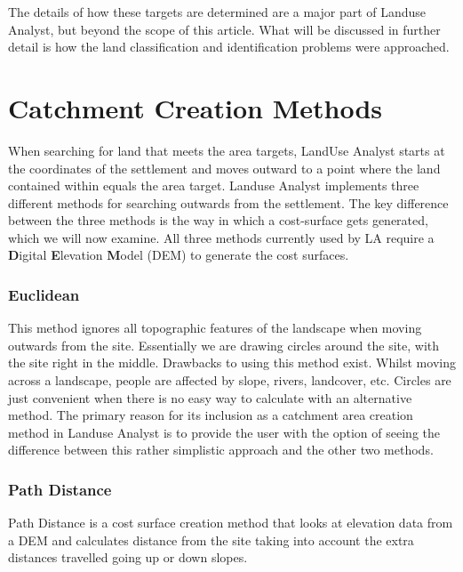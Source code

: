 The details of how these targets are determined are a major part of Landuse
Analyst, but beyond the scope of this article.  What will be discussed in
further detail is how the land classification and identification problems were
approached.

\section{Catchment Creation Methods} 

When searching for land that meets the area targets, LandUse Analyst starts at
the coordinates of the settlement and moves outward to a point where the land
contained within equals the area target.  Landuse Analyst implements three
different methods for searching outwards from the settlement.  The key
difference between the three methods is the way in which a cost-surface gets
generated, which we will now examine.  All three methods currently used by LA
require a \textbf{D}igital \textbf{E}levation \textbf{M}odel (DEM) to generate
the cost surfaces.



  \subsubsection{Euclidean} \label{subsection:Euclidean} 
  
  This method ignores all topographic features of the landscape when moving
  outwards from the site.  Essentially we are drawing circles around the site,
  with the site right in the middle.  Drawbacks to using this method exist.
  Whilst moving across a landscape, people are affected by slope, rivers,
  landcover, etc.  Circles are just convenient when there is no easy way to
  calculate with an alternative method.  The primary reason for its inclusion
  as a catchment area creation method in Landuse Analyst is to provide the user
  with the option of seeing the difference between this rather simplistic
  approach and the other two methods.

  \subsubsection{Path Distance}
  
  Path Distance is a cost surface creation method that looks at elevation data
  from a DEM and calculates distance from the site taking into account the
  extra distances travelled going up or down slopes.

